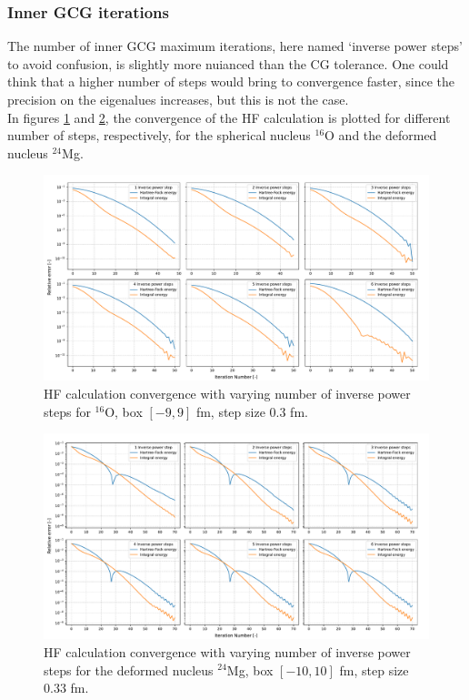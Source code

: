 \subsubsection{Inner GCG iterations}
The number of inner GCG maximum iterations, here named `inverse power steps' to avoid confusion, is slightly more nuianced than the CG tolerance. One could think that a higher number of steps would bring to convergence faster, since the precision on the eigenalues increases, but this is not the case.
\\In figures \ref{fig:conv_steps_o} and \ref{fig:conv_steps_mg}, the convergence of the HF calculation is plotted for different number of steps, respectively, for the spherical nucleus $^{16}$O and the deformed nucleus $^{24}$Mg. 
\begin{figure}[H]
    \centering
    \includegraphics[width=1.0\textwidth]{Images/conv_steps_o.pdf}
    \caption{HF calculation convergence with varying number of inverse power steps for $^{16}$O, box $[-9, 9]$ fm, step size $0.3$ fm.}
    \label{fig:conv_steps_o}
\end{figure}
\begin{figure}[H]
    \centering
    \includegraphics[width=1.0\textwidth]{Images/conv_steps.pdf}
    \caption{HF calculation convergence with varying number of inverse power steps for the deformed nucleus $^{24}$Mg, box $[-10, 10]$ fm, step size $0.33$ fm.}
    \label{fig:conv_steps_mg}
\end{figure}
